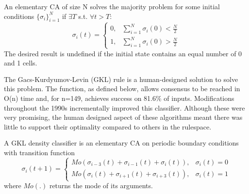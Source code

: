 \begin{definition}\label{def:majority-problem}
An elementary CA of size N solves the majority problem for some initial conditions $\{\sigma_i\}_{i=1}^{N}$ if $\exists T$ s.t. $\forall t > T$:
\[
    \sigma_i(t) = 
    \begin{cases}
    0, & \sum_{i=1}^{N}\sigma_i(0) < \frac{N}{2} \\
    1, & \sum_{i=1}^{N}\sigma_i(0) > \frac{N}{2}
    \end{cases}
\]
The desired result is undefined if the initial state contains an equal number of 0 and 1 cells.
\end{definition}

The Gacs-Kurdyumov-Levin (GKL) rule is a human-designed solution to solve this problem. The function, as defined below, allows consensus to be reached in O(n) time and, for n=149, achieves success on 81.6\% of inputs\cite{gacs1978one}. Modifications throughout the 1990s incrementally improved this classifier\cite{das1995evolving}. Although these were very promising, the human designed aspect of these algorithms meant there was little to support their optimality compared to others in the rulespace.

\begin{definition} \label{def:gkl}
A GKL density classifier is an elementary CA on periodic boundary conditions with transition function
\[
   \sigma_i(t+1) =
    \begin{cases}
    Mo(\sigma_{i-3}(t) + \sigma_{i-1}(t) + \sigma_i(t)), & \sigma_i(t) = 0 \\
    Mo(\sigma_i(t) + \sigma_{i+1}(t) + \sigma_{i+3}(t)), & \sigma_i(t) = 1
    \end{cases}
\]
where $Mo(.)$ returns the mode of its arguments.
\end{definition}

